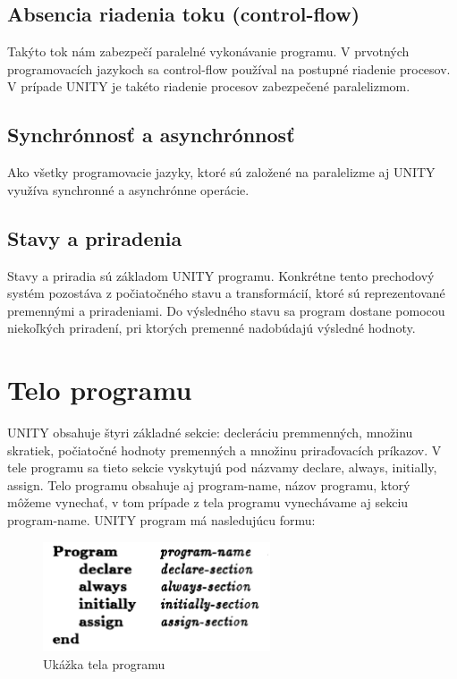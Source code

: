 \subsection{Absencia riadenia toku (control-flow)}
Takýto tok nám zabezpečí paralelné vykonávanie programu. V prvotných programovacích jazykoch sa control-flow používal
na postupné riadenie procesov. V prípade UNITY je takéto riadenie procesov zabezpečené paralelizmom.

\subsection{Synchrónnosť a asynchrónnosť}
Ako všetky programovacie jazyky, ktoré sú založené na paralelizme aj UNITY využíva synchronné a asynchrónne operácie. 

\subsection{Stavy a priradenia}
Stavy a priradia sú základom UNITY programu. Konkrétne tento prechodový systém pozostáva z počiatočného stavu a transformácií, 
ktoré sú reprezentované premennými a priradeniami. Do výsledného stavu sa program dostane pomocou niekoľkých priradení, pri ktorých 
premenné nadobúdajú výsledné hodnoty.

\section{Telo programu}

UNITY obsahuje štyri základné sekcie: decleráciu premmenných, množinu skratiek, 
počiatočné hodnoty premenných a množinu priraďovacích príkazov. 
V tele programu sa tieto sekcie vyskytujú pod názvamy declare, always, 
initially, assign. Telo programu obsahuje aj program-name, názov programu, 
ktorý môžeme vynechať, v tom prípade z tela programu vynechávame aj sekciu program-name. 
UNITY program má nasledujúcu formu:

\begin{figure}[h]
\centerline{\includegraphics[width=0.6\textwidth]{images/screen1}}
\caption[Ukážka tela programu]{Ukážka tela programu}
\label{obr:programbody}
\end{figure}

